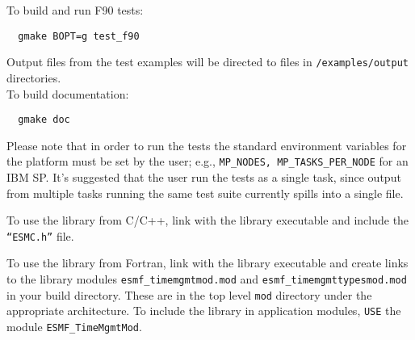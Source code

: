 \noindent To build and run F90 tests:
\begin{verbatim}
  gmake BOPT=g test_f90
\end{verbatim}

Output files from the test examples will be directed to files 
in {\tt */examples/output} directories. \\

\noindent To build documentation:
\begin{verbatim}
  gmake doc
\end{verbatim}

Please note that in order to run the tests the standard
environment variables for the platform must be set by the user; 
e.g., {\tt MP\_NODES, MP\_TASKS\_PER\_NODE} for an IBM SP.  It's suggested
that the user run the tests as a single task, since output from
multiple tasks running the same test suite currently spills into a single 
file.

To use the library from C/C++, link with the library executable and include
the {\tt ``ESMC.h''} file.

To use the library from Fortran, link with the library executable and
create links to the library modules {\tt esmf\_timemgmtmod.mod}
and {\tt esmf\_timemgmttypesmod.mod} in your build directory.  These are
in the top level {\tt mod} directory under the appropriate architecture.
To include the library in application modules, {\tt USE} the
module {\tt ESMF\_TimeMgmtMod}.  






